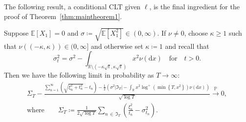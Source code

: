 \documentclass[AHL,Unicode,longabstracts,published]{cedram}
\newcommand\R{\mathbb{R}}
\newcommand\E{\mathds{E}}
\newcommand\p{\mathds{P}}
\newcommand\1{\mathds{1}}
\newcommand\D{\mathrm{d}}
\newcommand\GI{\mathfrak{I}}
\newcommand\cip{\xrightarrow{\p}}
\begin{document}
The following result, a conditional CLT given $\ell$, is the final ingredient for the proof of Theorem~\ref{thm:maintheorem1}.

\begin{prop}\label{prop:Upsilon-approx}
Suppose $\E[X_1]=0$ and $\sigma\coloneqq \sqrt{\E[X_1^2]}\in(0,\infty)$. If $\nu\ne0$, choose $\kappa\geq1$ such that $\nu((-\kappa,\kappa))\in(0,\infty]$ and otherwise set $\kappa\coloneqq 1$ and recall that
\[
\sigma_t^2=\sigma^2 -\int_{\R\setminus\left(-\kappa\sqrt{t},\kappa\sqrt{t}\right)} x^2\nu(\D x)\quad\text{for}\quad t>0.
\]
Then we have the following limit in probability as $T\to\infty$:
\begin{multline}\label{eq:Upsilon-approx}
\Sigma_T -\frac{\sum\limits_{n=1}^\infty \left(\sqrt{\xi_n^2+t_n^2}-t_n\right) -\frac{1}{2}\left(\sigma^2|\GI_T| -\int_\R x^2\log^+\left(\min\left\{T, x^2\right\}\right)\nu(\D x)\right)}{\sqrt{\log T}}
\cip 0,\\
\text{where}\qquad\Sigma_T\coloneqq
\frac{1}{2\sqrt{\log T}}\sum_{n\,\in\,\GI_T}
\left(\frac{\xi_n^2}{t_n}-\sigma_{t_n}^2\right).
\end{multline}
\end{prop}
\end{document}
